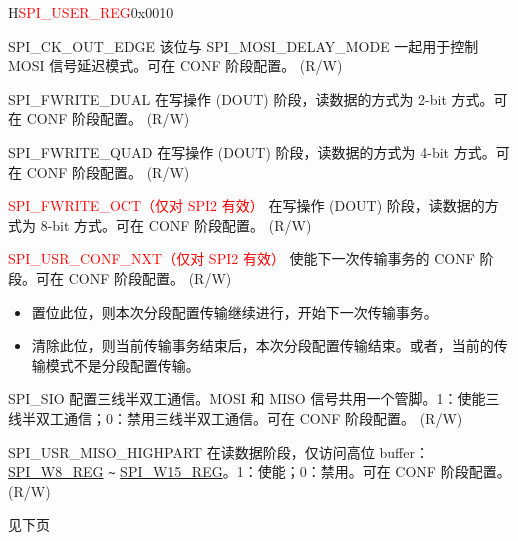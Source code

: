 \begin{register}{H}{\textcolor{red}{SPI\_USER\_REG}}{0x{}0010}
\begin{regdesc}
\begin{reglist}
\label{fielddesc:SPICKOUTEDGE}\item [SPI\_CK\_OUT\_EDGE] 该位与 SPI\_MOSI\_DELAY\_MODE 一起用于控制 MOSI 信号延迟模式。可在 CONF 阶段配置。 (R/W)
\label{fielddesc:SPIFWRITEDUAL}\item [SPI\_FWRITE\_DUAL] 在写操作 (DOUT) 阶段，读数据的方式为 2-bit 方式。可在 CONF 阶段配置。 (R/W)
\label{fielddesc:SPIFWRITEQUAD}\item [SPI\_FWRITE\_QUAD] 在写操作 (DOUT) 阶段，读数据的方式为 4-bit 方式。可在 CONF 阶段配置。 (R/W)
\label{fielddesc:SPIFWRITEOCT}\item [\textcolor{red}{SPI\_FWRITE\_OCT（仅对 SPI2 有效）}] 在写操作 (DOUT) 阶段，读数据的方式为 8-bit 方式。可在 CONF 阶段配置。 (R/W)
\label{fielddesc:SPIUSRCONFNXT}\item [\textcolor{red}{SPI\_USR\_CONF\_NXT（仅对 SPI2 有效）}]
使能下一次传输事务的 CONF 阶段。可在 CONF 阶段配置。 (R/W)
\begin{itemize}
    \item 置位此位，则本次分段配置传输继续进行，开始下一次传输事务。
    \item 清除此位，则当前传输事务结束后，本次分段配置传输结束。或者，当前的传输模式不是分段配置传输。
\end{itemize}
\label{fielddesc:SPISIO}\item [SPI\_SIO] 配置三线半双工通信。MOSI 和 MISO 信号共用一个管脚。1：使能三线半双工通信；0：禁用三线半双工通信。可在 CONF 阶段配置。 (R/W)
\label{fielddesc:SPIUSRMISOHIGHPART}\item [SPI\_USR\_MISO\_HIGHPART] 在读数据阶段，仅访问高位 buffer：\hyperref[regdesc:SPIW8REG]{SPI\_W8\_REG} \verb+~+ \hyperref[regdesc:SPIW15REG]{SPI\_W15\_REG}。1：使能；0：禁用。可在 CONF 阶段配置。 (R/W)

\item [见下页]
\end{reglist}\end{regdesc}
\end{register}

